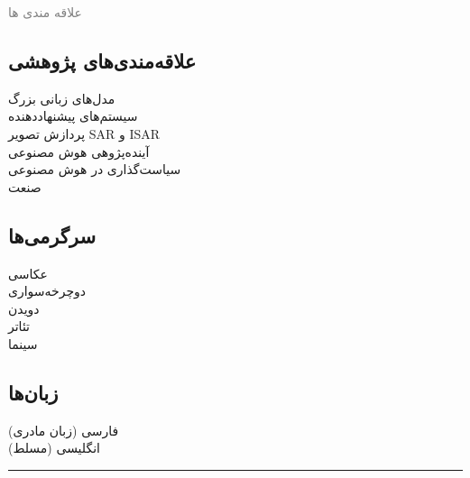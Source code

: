 \documentclass[a4paper]{deedy-persian} %
\begin{document}
\begin{minipage}[t]{0.33\textwidth} %
\textcolor{gray}{\huge{علاقه مندی ها}}
\vspace{\itemsep}

\subsection*{علاقه‌مندی‌های پژوهشی}
مدل‌های زبانی بزرگ\\
سیستم‌های پیشنهاددهنده\\
پردازش تصویر SAR و ISAR\\
آینده‌پژوهی هوش مصنوعی\\
سیاست‌گذاری در هوش مصنوعی\\
صنعت \\

\sectionspace %

\subsection*{سرگرمی‌ها}
عکاسی\\
دوچرخه‌سواری\\
دویدن\\
تئاتر\\
سینما\\

\sectionspace %

\subsection*{زبان‌ها}
فارسی (زبان مادری)\\
انگلیسی (مسلط)\\

\sectionspace %

\end{minipage} %
\hrule
\end{document}
